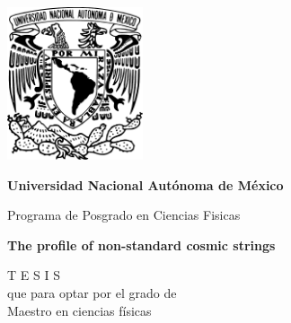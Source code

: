 	\begin{titlepage}
		\setlength{\parindent}{0pt} \setlength{\parskip}{0pt}
	
		\begin{center}
			
			\begin{minipage}{\textwidth}
				
				
				\begin{center}
					\includegraphics[width=4cm]{Escudo-UNAM.pdf}	
				\end{center} 	
				\begin{center}
					\Large\textbf{\sc Universidad Nacional Aut\'onoma de M\'exico}
				\end{center} 
				
			\end{minipage}
				
			\vfill
			
			\begin{minipage}{0.7\textwidth}
				\begin{center}
					\large \sc Programa de Posgrado en Ciencias Fisicas
				\end{center}
			\end{minipage}
			\begin{center}
				
				\Huge \textbf{\sc The profile of non-standard cosmic strings}
				
			\end{center}		
			\begin{center}
				\vspace*{0.3cm}
				{\large T E S I S}\\
				\vspace*{0.3cm}
				\sc que para optar por el grado de \\ \bigskip
				{\Large {\sc Maestro en ciencias físicas}} \\ \bigskip
				

\end{center}
\end{center}
\end{titlepage}
